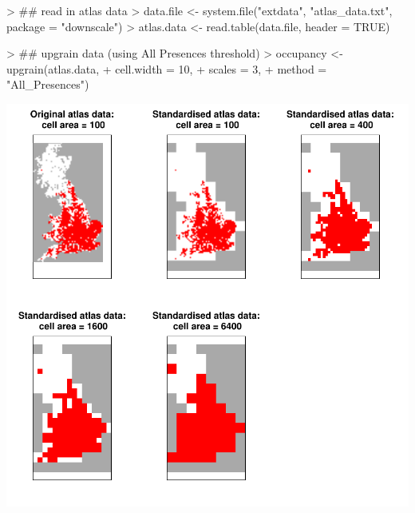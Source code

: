 \documentclass{article}[12pt, a4paper]
\begin{document}
\begin{Schunk}
\begin{Sinput}
> ## read in atlas data
> data.file <- system.file("extdata", "atlas_data.txt", package = "downscale")
> atlas.data <- read.table(data.file, header = TRUE)
\end{Sinput}
\end{Schunk}
\begin{Schunk}
\begin{Sinput}
> ## upgrain data (using All Presences threshold)
> occupancy <- upgrain(atlas.data,
+                      cell.width = 10,
+                      scales = 3,
+                      method = "All_Presences")
\end{Sinput}
\end{Schunk}
\includegraphics{Downscaling-downscale22}
\end{document}
